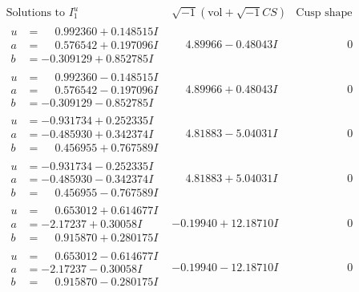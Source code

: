\documentclass[1p]{elsarticle_modified}
\theoremstyle{definition}
\newcommand{\I}{\sqrt{-1}}
\begin{document}
$$\begin{array}{c|c|c}  
\text{Solutions to }I^u_{1}& \I (\text{vol} + \sqrt{-1}CS) & \text{Cusp shape}\\
 \hline 
\begin{aligned}
u &= \phantom{-}0.992360 + 0.148515 I \\
a &= \phantom{-}0.576542 + 0.197096 I \\
b &= -0.309129 + 0.852785 I\end{aligned}
 & \phantom{-}4.89966 - 0.48043 I & \phantom{-0.000000 } 0 \\ \hline\begin{aligned}
u &= \phantom{-}0.992360 - 0.148515 I \\
a &= \phantom{-}0.576542 - 0.197096 I \\
b &= -0.309129 - 0.852785 I\end{aligned}
 & \phantom{-}4.89966 + 0.48043 I & \phantom{-0.000000 } 0 \\ \hline\begin{aligned}
u &= -0.931734 + 0.252335 I \\
a &= -0.485930 + 0.342374 I \\
b &= \phantom{-}0.456955 + 0.767589 I\end{aligned}
 & \phantom{-}4.81883 - 5.04031 I & \phantom{-0.000000 } 0 \\ \hline\begin{aligned}
u &= -0.931734 - 0.252335 I \\
a &= -0.485930 - 0.342374 I \\
b &= \phantom{-}0.456955 - 0.767589 I\end{aligned}
 & \phantom{-}4.81883 + 5.04031 I & \phantom{-0.000000 } 0 \\ \hline\begin{aligned}
u &= \phantom{-}0.653012 + 0.614677 I \\
a &= -2.17237 + 0.30058 I \\
b &= \phantom{-}0.915870 + 0.280175 I\end{aligned}
 & -0.19940 + 12.18710 I & \phantom{-0.000000 } 0 \\ \hline\begin{aligned}
u &= \phantom{-}0.653012 - 0.614677 I \\
a &= -2.17237 - 0.30058 I \\
b &= \phantom{-}0.915870 - 0.280175 I\end{aligned}
 & -0.19940 - 12.18710 I & \phantom{-0.000000 } 0 \\ \hline\begin{aligned}

\end{aligned}
\end{array}$$
\end{document}
